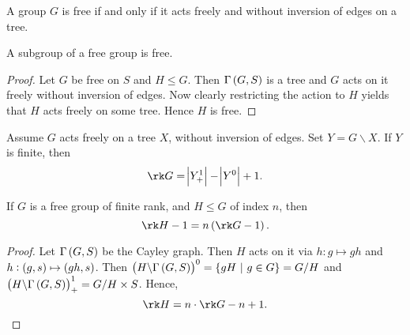 \begin{theorem}
A group $ G $ is free if and only if it acts freely and without inversion of edges on a tree.
\end{theorem}

\begin{theorem}
A subgroup of a free group is free.
\end{theorem}

\begin{proof}
Let $ G $ be free on $ S $ and $ H \le G $. Then $ \Gamma\br{G, S} $ is a tree and $ G  $ acts on it freely without inversion of edges. Now clearly restricting the action to $ H $ yields that $ H $ acts freely on some tree. Hence $ H $ is free.
\end{proof}

\pagebreak

\begin{exercise}
Assume $ G $ acts freely on a tree $ X $, without inversion of edges. Set $ Y = G \backslash X $. If $ Y $ is finite, then
$$ \rk G = \abs{Y_+^1} - \abs{Y^0} + 1. $$
\end{exercise}

\begin{lemma}
If $ G $ is a free group of finite rank, and $ H \le G $ of index $ n $, then
$$ \rk H - 1 = n\br{\rk G - 1}. $$
\end{lemma}

\begin{proof}
Let $ \Gamma\br{G, S} $ be the Cayley graph. Then $ H $ acts on it via $ h : g \mapsto gh $ and $ h : \br{g, s} \mapsto \br{gh, s} $. Then $ \br{H \backslash \Gamma\br{G, S}}^0 = \cbr{gH \st g \in G} = G / H $ and $ \br{H \backslash \Gamma\br{G, S}}_+^1 = G / H \times S $. Hence,
$$ \rk H = n \cdot \rk G - n + 1. $$
\end{proof}

